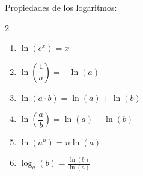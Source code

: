 \documentclass{article}
\begin{document}

Propiedades de los logaritmos:
\begin{multicols}{2}
  \begin{enumerate}
    \item $\ln(e^x) = x$
    \item $\ln\left(\dfrac{1}{a}\right) = -\ln(a)$
    \item $\ln(a\cdot b) = \ln(a)+\ln(b)$
    \item $\ln\left(\dfrac{a}{b}\right) = \ln(a)-\ln(b)$
    \item $\ln(a^n) = n\ln(a)$
    \item $\log_a(b) = \frac{\ln(b)}{\ln(a)}$
  \end{enumerate}
\end{multicols}
\vspace{2mm}
\end{document}
